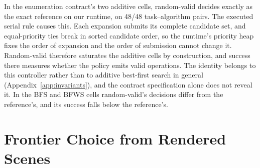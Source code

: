 In the enumeration contract's two additive cells, random-valid decides exactly as the exact reference on our runtime, on 48/48 task--algorithm pairs. The executed serial rule causes this. Each expansion submits its complete candidate set, and equal-priority ties break in sorted candidate order, so the runtime's priority heap fixes the order of expansion and the order of submission cannot change it. Random-valid therefore saturates the additive cells by construction, and success there measures whether the policy emits valid operations. The identity belongs to this controller rather than to additive best-first search in general (Appendix~\ref{app:invariants}), and the contract specification alone does not reveal it. In the BFS and BFWS cells random-valid's decisions differ from the reference's, and its success falls below the reference's.




\section{Frontier Choice from Rendered Scenes}
\label{app:choice-frontier}
\label{sec:results-choice-frontier}

